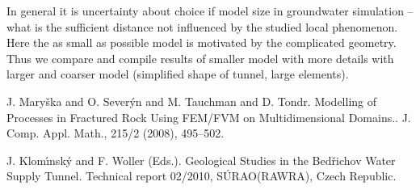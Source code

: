 In general it is uncertainty about choice if model size in groundwater simulation -- what is the sufficient distance not influenced by the studied local phenomenon. Here the as small as possible model is motivated by the complicated geometry. Thus we compare and compile results of smaller model with more details with larger and coarser model (simplified shape of tunnel, large elements).


\begin{thebibliography}{10}

{\sc J. Mary\v{s}ka and O. Sever\'{y}n and M. Tauchman and D. Tondr}. {Modelling of Processes in Fractured Rock Using FEM/FVM on Multidimensional Domains.}. J. Comp. Appl. Math., 215/2  (2008), 495--502.



{\sc J. Klom\'{\i}nsk\'y and F. Woller (Eds.)}. {Geological Studies in the Bed\v{r}ichov Water Supply Tunnel}. Technical report  02/2010, S\'URAO(RAWRA), Czech Republic.

\end{thebibliography}
